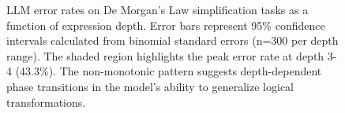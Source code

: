 \documentclass[11pt,a4paper]{article}
\begin{document}
\begin{figure}[h!]
\caption{LLM error rates on De Morgan's Law simplification tasks as a function of expression depth. 
Error bars represent 95\% confidence intervals calculated from binomial standard errors (n=300 per depth range). 
The shaded region highlights the peak error rate at depth 3-4 (43.3\%). 
The non-monotonic pattern suggests depth-dependent phase transitions in the model's ability to generalize logical transformations.}
\label{fig:error_rates}
\end{figure}
\end{document}
